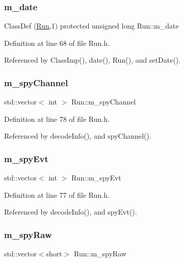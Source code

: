 \subsubsection{\texorpdfstring{m\+\_\+date}{m\_date}}
{\footnotesize\ttfamily Class\+Def (\hyperlink{classRun}{Run},1) protected unsigned long Run\+::m\+\_\+date}



Definition at line 68 of file Run.\+h.



Referenced by Class\+Imp(), date(), Run(), and set\+Date().

\mbox{\label{classRun_abe97602a3597cc941906069386a8d9aa}} 
\subsubsection{\texorpdfstring{m\+\_\+spy\+Channel}{m\_spyChannel}}
{\footnotesize\ttfamily std\+::vector$<$ int $>$ Run\+::m\+\_\+spy\+Channel}



Definition at line 78 of file Run.\+h.



Referenced by decode\+Info(), and spy\+Channel().

\mbox{\label{classRun_ae812e1695eafeb95fb54594047e98d95}} 
\subsubsection{\texorpdfstring{m\+\_\+spy\+Evt}{m\_spyEvt}}
{\footnotesize\ttfamily std\+::vector$<$ int $>$ Run\+::m\+\_\+spy\+Evt}



Definition at line 77 of file Run.\+h.



Referenced by decode\+Info(), and spy\+Evt().

\mbox{\label{classRun_a825ab81f2a93f291878235dc13536688}} 
\subsubsection{\texorpdfstring{m\+\_\+spy\+Raw}{m\_spyRaw}}
{\footnotesize\ttfamily std\+::vector$<$short$>$ Run\+::m\+\_\+spy\+Raw}



